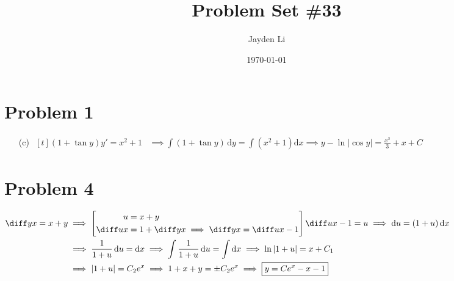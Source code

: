 \documentclass{article}
\title{\vspace*{-30pt}Problem Set \#33}
\author{Jayden Li}
\date{\today}
\newcommand*{\problem}[1]{\section*{Problem #1}}
\begin{document}
\fontsize{12pt}{12pt}\selectfont
\setlength{\abovedisplayskip}{0pt}
\maketitle
\problem{1}
\begin{itemize}
	\item[(c)]
		$\begin{aligned}[t]
			(1+\tan y)y'=x^2+1
			&\implies \int(1+\tan y)\,\mathrm{d}y=\int\left(x^2+1\right)\mathrm{d}x
			\boxed{\implies y-\ln|\cos y|=\frac{x^3}{3}+x+C}
		\end{aligned}$
\end{itemize}

\problem{4}
$\begin{aligned}[t]
    \diff yx=x+y
	&\implies \left[\begin{aligned}
			u&=x+y \\
			\diff ux&=1+\diff yx
			\implies \diff yx=\diff ux-1
	\end{aligned}\right]
	\diff ux-1=u
	\implies \mathrm{d}u=(1+u)\,\mathrm{d}x \\
	&\implies \frac{1}{1+u}\,\mathrm{d}u=\mathrm{d}x
	\implies \int \frac{1}{1+u}\,\mathrm{d}u=\int \mathrm{d}x
	\implies \ln|1+u|=x+C_1 \\
	&\implies |1+u|=C_2e^x
	\implies 1+x+y=\pm C_2e^x
	\implies \boxed{y=Ce^x-x-1}
\end{aligned}$
\end{document}
